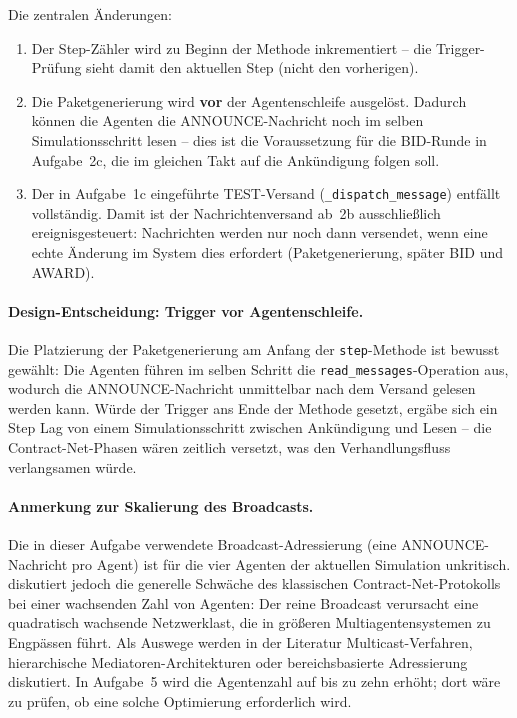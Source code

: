 Die zentralen Änderungen:
\begin{enumerate}
    \item Der Step-Zähler wird zu Beginn der Methode inkrementiert -- die Trigger-Prüfung sieht damit den aktuellen Step (nicht den vorherigen).
    \item Die Paketgenerierung wird \textbf{vor} der Agentenschleife ausgelöst. Dadurch können die Agenten die ANNOUNCE-Nachricht noch im selben Simulationsschritt lesen -- dies ist die Voraussetzung für die BID-Runde in Aufgabe~2c, die im gleichen Takt auf die Ankündigung folgen soll.
    \item Der in Aufgabe~1c eingeführte TEST-Versand (\texttt{\_dispatch\_message}) entfällt vollständig. Damit ist der Nachrichtenversand ab~2b ausschließlich ereignisgesteuert: Nachrichten werden nur noch dann versendet, wenn eine echte Änderung im System dies erfordert (Paketgenerierung, später BID und AWARD).
\end{enumerate}

\paragraph{Design-Entscheidung: Trigger vor Agentenschleife.}
\label{par:design_trigger_2b}
Die Platzierung der Paketgenerierung am Anfang der \texttt{step}-Methode ist bewusst gewählt: Die Agenten führen im selben Schritt die \texttt{read\_messages}-Operation aus, wodurch die ANNOUNCE-Nachricht unmittelbar nach dem Versand gelesen werden kann. Würde der Trigger ans Ende der Methode gesetzt, ergäbe sich ein Step Lag von einem Simulationsschritt zwischen Ankündigung und Lesen -- die Contract-Net-Phasen wären zeitlich versetzt, was den Verhandlungsfluss verlangsamen würde.

\paragraph{Anmerkung zur Skalierung des Broadcasts.}
Die in dieser Aufgabe verwendete Broadcast-Adressierung (eine ANNOUNCE-Nachricht pro Agent) ist für die vier Agenten der aktuellen Simulation unkritisch. \textcite[S. 31\,f.]{5} diskutiert jedoch die generelle Schwäche des klassischen Contract-Net-Protokolls bei einer wachsenden Zahl von Agenten: Der reine Broadcast verursacht eine quadratisch wachsende Netzwerklast, die in größeren Multiagentensystemen zu Engpässen führt. Als Auswege werden in der Literatur Multicast-Verfahren, hierarchische Mediatoren-Architekturen \cite[S. 32]{5} oder bereichsbasierte Adressierung diskutiert. In Aufgabe~5 wird die Agentenzahl auf bis zu zehn erhöht; dort wäre zu prüfen, ob eine solche Optimierung erforderlich wird.

